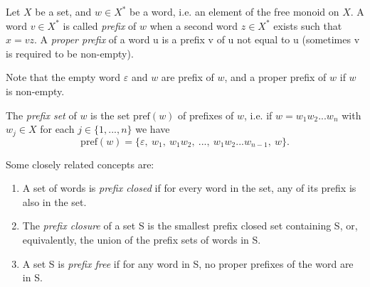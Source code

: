 \documentclass[12pt]{article}
\begin{document}
\newcommand{\prefi}{\mathrm{pref}}

Let $X$ be a set, and $w\in X^*$ be a word, i.e. an element of the free  monoid on $X$. A word $v\in X^*$ is called \emph{prefix} of $w$ when a second word $z\in X^*$ exists such that $x=vz$.  A \emph{proper prefix} of a word u is a prefix v of u not equal to u (sometimes v is required to be non-empty).

Note that the empty word $\varepsilon$ and $w$ are prefix of $w$, and a proper prefix of $w$ if $w$ is non-empty.

The \emph{prefix set} of $w$ is the set $\prefi(w)$ of prefixes of $w$, i.e. if $w=w_1w_2...w_n$ with $w_j\in X$ for each $j\in\{1,...,n\}$ we have $$\prefi(w)=\{\varepsilon,\ w_1,\ w_1w_2,\ ... ,\ w_1w_2...w_{n-1},\ w\}.$$

Some closely related concepts are:

\begin{enumerate}
\item 
A set of words is \emph{prefix closed} if for every word in the set, any of its prefix is also in the set.
\item 
The \emph{prefix closure} of a set S is the smallest prefix closed set containing S, or, equivalently, the union of the prefix sets of words in S.
\item
A set S is \emph{prefix free} if for any word in S, no proper prefixes of the word are in S.
\end{enumerate}
\end{document}
